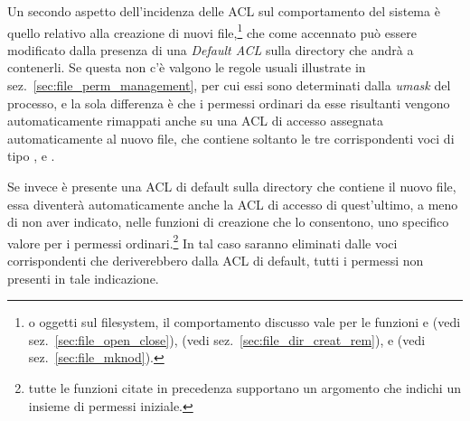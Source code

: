 Un secondo aspetto dell'incidenza delle ACL sul comportamento del sistema è
quello relativo alla creazione di nuovi file,\footnote{o oggetti sul
  filesystem, il comportamento discusso vale per le funzioni  e
   (vedi sez.~\ref{sec:file_open_close}),  (vedi
  sez.~\ref{sec:file_dir_creat_rem}),  e  (vedi
  sez.~\ref{sec:file_mknod}).} che come accennato può essere modificato dalla
presenza di una \textit{Default ACL} sulla directory che andrà a contenerli.
Se questa non c'è valgono le regole usuali illustrate in
sez.~\ref{sec:file_perm_management}, per cui essi sono determinati dalla
\textit{umask} del processo, e la sola differenza è che i permessi ordinari da
esse risultanti vengono automaticamente rimappati anche su una ACL di accesso
assegnata automaticamente al nuovo file, che contiene soltanto le tre
corrispondenti voci di tipo ,  e
.

Se invece è presente una ACL di default sulla directory che contiene il nuovo
file, essa diventerà automaticamente anche la ACL di accesso di quest'ultimo,
a meno di non aver indicato, nelle funzioni di creazione che lo consentono,
uno specifico valore per i permessi ordinari.\footnote{tutte le funzioni
  citate in precedenza supportano un argomento  che indichi un
  insieme di permessi iniziale.} In tal caso saranno eliminati dalle voci
corrispondenti che deriverebbero dalla ACL di default, tutti i permessi non
presenti in tale indicazione.

